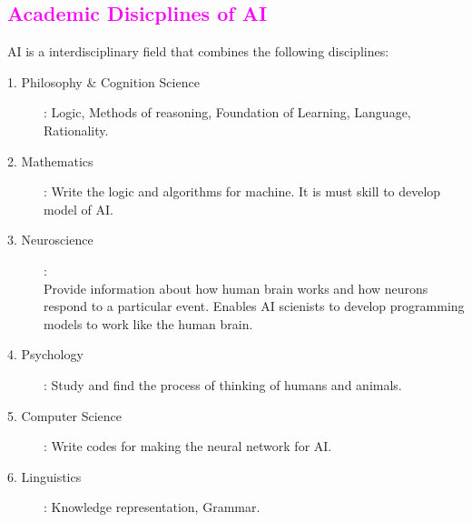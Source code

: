 \documentclass{book}
\begin{document}
\newpage
\textcolor{magenta}{\section{\textbf{Academic Disicplines of AI}}}
AI is a interdisciplinary field that combines the following disciplines:
\begin{description}
    \item[1. Philosophy \& Cognition Science]: Logic, Methods of reasoning, Foundation of Learning, Language, Rationality.
    \item[2. Mathematics]: Write the logic and algorithms for machine. It is must skill to develop  model of AI.
    \item[3. Neuroscience]: \\
    Provide information about how human brain works and how neurons respond to a particular event. Enables AI scienists to develop programming models to work like the human brain.
    \item[4. Psychology]: Study and find the process of thinking of humans and animals.
    \item[5. Computer Science]: Write codes  for making the neural network for AI. 
    \item[6. Linguistics]: Knowledge representation, Grammar.  
\end{description}
\end{document}
